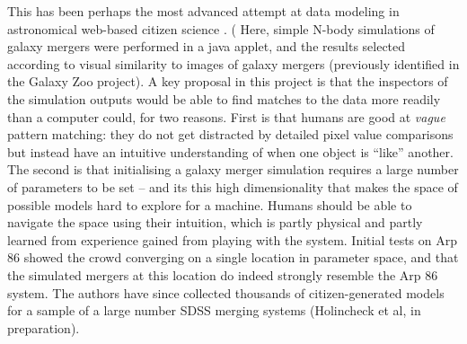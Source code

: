 \documentclass{ar2e}
\begin{document}

 This has been perhaps the most advanced attempt
at data modeling in  astronomical web-based citizen science
\citep{HolincheckEtal2010,WallinEtal2010}. ( Here, simple
N-body simulations of galaxy mergers were performed in a java applet, and the
results selected according to visual similarity to images of galaxy mergers
(previously identified in the Galaxy Zoo project). A key proposal in this
project is that the inspectors of the simulation outputs would be able to find
matches to the data more readily than a computer could, for two reasons. First
is that humans are good at {\it vague} pattern matching: they do not get
distracted by detailed pixel value comparisons but instead have an intuitive
understanding of when one object is ``like'' another. The second is that
initialising a galaxy merger simulation requires a large number of parameters to
be set -- and its this high dimensionality  that makes the space of possible
models hard to explore for a machine. Humans should be able to navigate the
space using their intuition, which is partly physical and partly learned from
experience gained from playing with the system. Initial tests on Arp 86  showed
the crowd converging on a single location in parameter space, and that the
simulated mergers at this location do indeed strongly resemble the Arp 86
system. The authors have since collected thousands of citizen-generated models
for a sample of a large number SDSS merging systems (Holincheck et al, in
preparation). 

\end{document}

